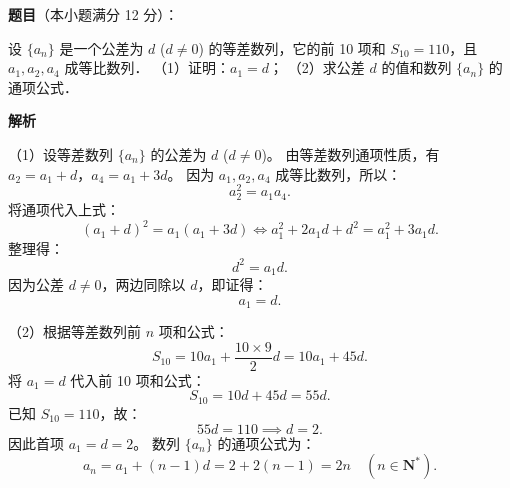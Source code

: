 \begin{answer}

\textbf{题目}（本小题满分 12 分）：

设 $\{a_n\}$ 是一个公差为 $d$ ($d \ne 0$) 的等差数列，它的前 10 项和 $S_{10} = 110$，且 $a_1, a_2, a_4$ 成等比数列．
（1）证明：$a_1 = d$；
（2）求公差 $d$ 的值和数列 $\{a_n\}$ 的通项公式．

\textbf{解析}

（1）设等差数列 $\{a_n\}$ 的公差为 $d$ ($d \neq 0$)。
由等差数列通项性质，有 $a_2 = a_1 + d$，$a_4 = a_1 + 3d$。
因为 $a_1, a_2, a_4$ 成等比数列，所以：
\nopagebreak[4]
\[
a_2^2 = a_1 a_4.
\]
将通项代入上式：
\nopagebreak[4]
\[
(a_1 + d)^2 = a_1(a_1 + 3d) \iff a_1^2 + 2a_1 d + d^2 = a_1^2 + 3a_1 d.
\]
整理得：
\nopagebreak[4]
\[
d^2 = a_1 d.
\]
因为公差 $d \neq 0$，两边同除以 $d$，即证得：
\nopagebreak[4]
\[
a_1 = d.
\]

（2）根据等差数列前 $n$ 项和公式：
\nopagebreak[4]
\[
S_{10} = 10a_1 + \dfrac{10 \times 9}{2}d = 10a_1 + 45d.
\]
将 $a_1 = d$ 代入前 10 项和公式：
\nopagebreak[4]
\[
S_{10} = 10d + 45d = 55d.
\]
已知 $S_{10} = 110$，故：
\nopagebreak[4]
\[
55d = 110 \implies d = 2.
\]
因此首项 $a_1 = d = 2$。
数列 $\{a_n\}$ 的通项公式为：
\nopagebreak[4]
\[
a_n = a_1 + (n - 1)d = 2 + 2(n - 1) = 2n \quad (n \in \mathbf{N}^*).
\]


\end{answer}
